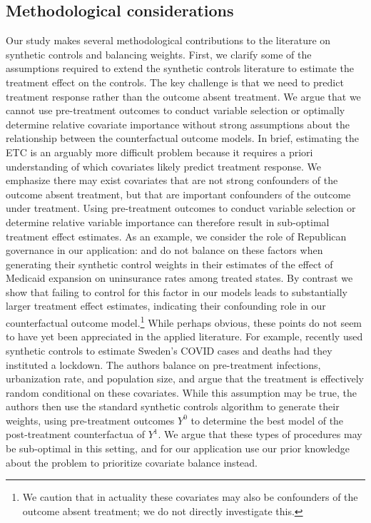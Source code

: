 \documentclass[article]{imsart}
\theoremstyle{plain}
\theoremstyle{remark}
\begin{document}
\subsection{Methodological considerations}

Our study makes several methodological contributions to the literature on synthetic controls and balancing weights. First, we clarify some of the assumptions required to extend the synthetic controls literature to estimate the treatment effect on the controls. The key challenge is that we need to predict treatment response rather than the outcome absent treatment. We argue that we cannot use pre-treatment outcomes to conduct variable selection or optimally determine relative covariate importance without strong assumptions about the relationship between the counterfactual outcome models. In brief, estimating the ETC is an arguably more difficult problem because it requires a priori understanding of which covariates likely predict treatment response. We emphasize there may exist covariates that are not strong confounders of the outcome absent treatment, but that are important confounders of the outcome under treatment. Using pre-treatment outcomes to conduct variable selection or determine relative variable importance can therefore result in sub-optimal treatment effect estimates. As an example, we consider the role of Republican governance in our application: \cite{kaestner2017effects} and \cite{courtemanche2017early} do not balance on these factors when generating their synthetic control weights in their estimates of the effect of Medicaid expansion on uninsurance rates among treated states. By contrast we show that failing to control for this factor in our models leads to substantially larger treatment effect estimates, indicating their confounding role in our counterfactual outcome model.\footnote{We caution that in actuality these covariates may also be confounders of the outcome absent treatment; we do not directly investigate this.} While perhaps obvious, these points do not seem to have yet been appreciated in the applied literature. For example, \cite{born2020lockdowns} recently used synthetic controls to estimate Sweden's COVID cases and deaths had they instituted a lockdown. The authors balance on pre-treatment infections, urbanization rate, and population size, and argue that the treatment is effectively random conditional on these covariates. While this assumption may be true, the authors then use the standard synthetic controls algorithm to generate their weights, using pre-treatment outcomes $Y^0$ to determine the best model of the post-treatment counterfactua of $Y^1$. We argue that these types of procedures may be sub-optimal in this setting, and for our application use our prior knowledge about the problem to prioritize covariate balance instead.
\end{document}
